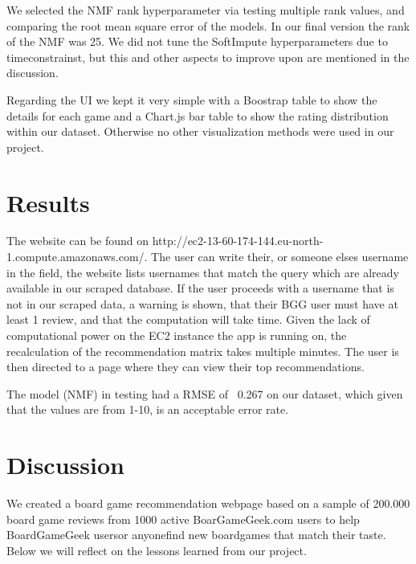 \documentclass[a4paper,12pt,bibliography=totoc,numbers=noenddot,sfdefaults=false,abstract=true,notitlepage]{scrartcl} %
\begin{document}
    We selected the NMF rank hyperparameter via testing multiple rank values, and comparing the root mean square error of the models. In our final version the rank of the NMF
    was 25. We did not tune the SoftImpute hyperparameters due to timeconstrainst, but this and other aspects to improve upon are mentioned in the discussion.

	Regarding the UI we kept it very simple with a Boostrap table to show the details for each game and a Chart.js bar table to show the rating distribution within our dataset. Otherwise no other visualization methods were used in our project.
	
	
	
	\section{Results}\label{results}
	
	
	The website can be found on http://ec2-13-60-174-144.eu-north-1.compute.amazonaws.com/. The user can write their, or someone elses username in the field, the
    website lists usernames that match the query which are already available in our scraped database. If the user proceeds with a username that is not in our scraped
    data, a warning is shown, that their BGG user must have at least 1 review, and that the computation will take time. Given the lack of computational power on the EC2
    instance the app is running on, the recalculation of the recommendation matrix takes multiple minutes. The user is then directed to a page where they can view their
    top recommendations.

    The model (NMF) in testing had a RMSE of ~0.267 on our dataset, which given that the values are from 1-10, is an acceptable error rate.
	
	
	
	
	
	\section{Discussion}\label{discussion}

	We created a board game recommendation webpage based on a sample of 200.000 board game reviews from 1000 active BoarGameGeek.com users to help BoardGameGeek users\textemdash or anyone\textemdash find new boardgames that match their taste. Below we will reflect on the lessons learned from our project.
	
\end{document}
